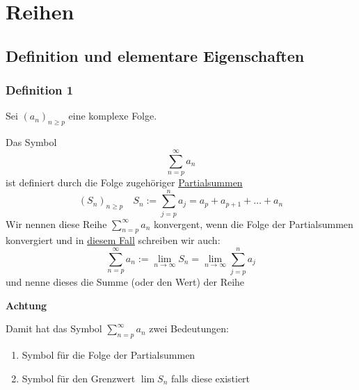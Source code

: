 \chapter{Reihen}
\section{Definition und elementare Eigenschaften}

\subsection{Definition 1}

Sei $(a_n)_{n\geq p}$ eine komplexe Folge.

Das Symbol 
\[\sum_{n=p}^\infty a_n\]
ist definiert durch die Folge zugehöriger \underline{Partialsummen}
\[(S_n)_{n \geq p} \quad S_n := \sum_{j=p}^n a_j = a_p +a_{p+1} + \ldots + a_n \]
Wir nennen diese Reihe $\sum_{n=p}^\infty a_n$ konvergent, wenn die Folge der Partialsummen konvergiert und in \underline{diesem Fall} schreiben wir auch:
\[\sum_{n=p}^\infty a_n := \lim_{n\to \infty} S_n = \lim_{n\to \infty} \sum_{j=p}^n a_j\]
und nenne dieses die Summe (oder den Wert) der Reihe

\textbf{Achtung}

Damit hat das Symbol $\sum_{n=p}^\infty a_n$ zwei Bedeutungen:

\begin{enumerate}
  \item Symbol für die Folge der Partialsummen
  \item Symbol für den Grenzwert $\lim S_n$ falls diese existiert
\end{enumerate}

